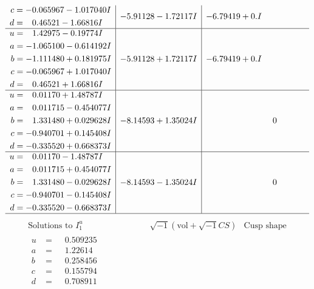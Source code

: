 \documentclass[1p]{elsarticle_modified}
\theoremstyle{definition}
\newcommand{\I}{\sqrt{-1}}
\begin{document}
$$\begin{array}{c|c|c}
\begin{aligned}
c &= -0.065967 - 1.017040 I \\
d &= \phantom{-}0.46521 - 1.66816 I\end{aligned}
 & -5.91128 - 1.72117 I & -6.79419 + 0. I\phantom{ +0.000000I} \\ \hline\begin{aligned}
u &= \phantom{-}1.42975 - 0.19774 I \\
a &= -1.065100 - 0.614192 I \\
b &= -1.111480 + 0.181975 I \\
c &= -0.065967 + 1.017040 I \\
d &= \phantom{-}0.46521 + 1.66816 I\end{aligned}
 & -5.91128 + 1.72117 I & -6.79419 + 0. I\phantom{ +0.000000I} \\ \hline\begin{aligned}
u &= \phantom{-}0.01170 + 1.48787 I \\
a &= \phantom{-}0.011715 - 0.454077 I \\
b &= \phantom{-}1.331480 + 0.029628 I \\
c &= -0.940701 + 0.145408 I \\
d &= -0.335520 + 0.668373 I\end{aligned}
 & -8.14593 + 1.35024 I & \phantom{-0.000000 } 0 \\ \hline\begin{aligned}
u &= \phantom{-}0.01170 - 1.48787 I \\
a &= \phantom{-}0.011715 + 0.454077 I \\
b &= \phantom{-}1.331480 - 0.029628 I \\
c &= -0.940701 - 0.145408 I \\
d &= -0.335520 - 0.668373 I\end{aligned}
 & -8.14593 - 1.35024 I & \phantom{-0.000000 } 0\\
 \hline 
 \end{array}$$\newpage$$\begin{array}{c|c|c}  
\text{Solutions to }I^u_{1}& \I (\text{vol} + \sqrt{-1}CS) & \text{Cusp shape}\\
 \hline 
\begin{aligned}
u &= \phantom{-}0.509235\phantom{ +0.000000I} \\
a &= \phantom{-}1.22614\phantom{ +0.000000I} \\
b &= \phantom{-}0.258456\phantom{ +0.000000I} \\
c &= \phantom{-}0.155794\phantom{ +0.000000I} \\
d &= \phantom{-}0.708911\phantom{ +0.000000I}\end{aligned}

\end{array}$$
\end{document}
